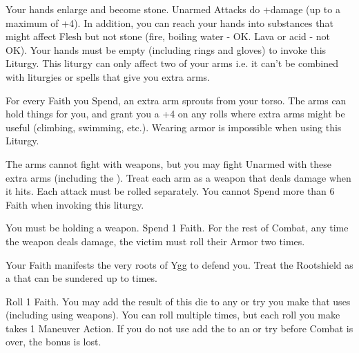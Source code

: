 \begin{multicols*}{2}
Your hands enlarge and become stone.  Unarmed Attacks do +\DICE damage (up to a maximum of +4).  In addition, you can reach your hands into substances that might affect Flesh but not stone (fire, boiling water - OK.  Lava or acid - not OK). Your hands must be empty (including rings and gloves) to invoke this Liturgy. This liturgy can only affect two of your arms i.e. it can't be combined with liturgies or spells that give you extra arms.


\LITURGY [
    Name = Pummeling Hands,
    Link = arcana-mystery-pummeling-hands,
    Paradigm = Monstrous,
    Duration=\DICE Maneuvers
]

For every Faith you Spend, an extra arm sprouts from your torso. The arms can hold things for you, and grant you a +4 on any rolls where extra arms might be useful (climbing, swimming, etc.). Wearing armor is impossible when using this Liturgy.

The arms cannot fight with weapons, but you may fight Unarmed with these extra arms (including the  ). Treat each arm as a \FOC weapon that deals \DICE damage when it hits. Each attack must be rolled separately.  You cannot Spend more than 6 Faith when invoking this liturgy.


\LITURGY [
  Name = Rending Strike,
  Link = arcana-mystery-rending-strike,
  Paradigm = Ruinous,
  Duration=1 Maneuver Action
]

You must be holding a  weapon. Spend 1 Faith. For the rest of Combat, any time the weapon deals damage, the victim must roll their Armor \UD two times.

\newpage


\LITURGY [
  Name = Rootshield,
  Link = arcana-mystery-rootshield,
  Paradigm = Heathen,
  Duration=2 Maneuver Actions
]

Your Faith manifests the very roots of Ygg to defend you. Treat the Rootshield as a  that can be sundered up to \DICE times.

\LITURGY [
  Name = Sirocco,
  Link = arcana-mystery-sirocco,
  Paradigm = Empyrean,
  Duration=1 Maneuver Action
]

Roll 1 Faith. You may add the result of this die to any \RO or \RB try you make that uses \DEX (including using \DEX weapons). You can roll multiple times, but each roll you make takes 1 Maneuver Action. If you do not use add the \SUMDICE to an \RO or \RB try before Combat is over, the bonus is lost.


\end{multicols*}
